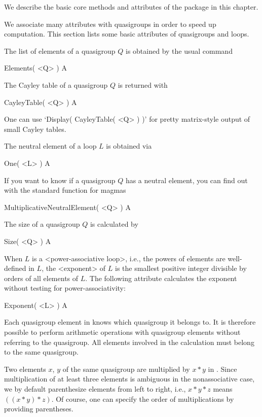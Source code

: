 
We describe the basic core methods and attributes of the {\LOOPS} package in this chapter.


We associate many attributes with quasigroups in order to speed up computation.
This section lists some basic attributes of quasigroups and loops.

The list of elements of a quasigroup $Q$ is obtained by the usual command

\>Elements( <Q> ) A

The Cayley table of a quasigroup $Q$ is returned with

\>CayleyTable( <Q> ) A

One can use `Display( CayleyTable( <Q> ) )' for pretty matrix-style output of
small Cayley tables.

The neutral element of a loop $L$ is obtained via

\>One( <L> ) A

If you want to know if a quasigroup $Q$ has a neutral element, you can find out
with the standard function for magmas

\>MultiplicativeNeutralElement( <Q> ) A

The size of a quasigroup $Q$ is calculated by

\>Size( <Q> ) A

When $L$ is a <power-associative loop>, i.e., the
powers of elements are well-defined in $L$, the <exponent> of
$L$ is the smallest positive integer divisible by orders of all elements of
$L$. The following attribute calculates the exponent without testing for
power-associativity:

\>Exponent( <L> ) A


Each quasigroup element in {\GAP} knows which quasigroup it belongs to. It is
therefore possible to perform arithmetic operations with quasigroup elements
without referring to the quasigroup. All elements involved in the calculation
must belong to the same quasigroup.

Two elements $x$, $y$ of the same quasigroup are multiplied by $x*y$ in {\GAP}.
Since multiplication of at least three elements is ambiguous in the
nonassociative case, we by default parenthesize elements from left to right,
i.e., $x*y*z$ means $((x*y)*z)$. Of course, one can specify the order of
multiplications by providing parentheses.

